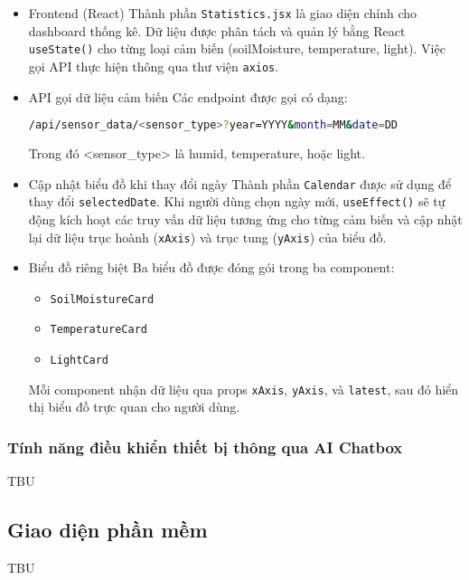 \begin{itemize}
    \item Frontend (React) \newline
    Thành phần \texttt{Statistics.jsx} là giao diện chính cho dashboard thống kê. Dữ liệu được phân tách và quản lý bằng React \texttt{useState()} cho từng loại cảm biến (soilMoisture, temperature, light). Việc gọi API thực hiện thông qua thư viện \texttt{axios}.

    \item API gọi dữ liệu cảm biến \newline
    Các endpoint được gọi có dạng:
    \begin{lstlisting}[language=bash]
/api/sensor_data/<sensor_type>?year=YYYY&month=MM&date=DD
    \end{lstlisting}
    Trong đó <sensor\_type> là humid, temperature, hoặc light.

    \item Cập nhật biểu đồ khi thay đổi ngày \newline
    Thành phần \texttt{Calendar} được sử dụng để thay đổi \texttt{selectedDate}. Khi người dùng chọn ngày mới, \texttt{useEffect()} sẽ tự động kích hoạt các truy vấn dữ liệu tương ứng cho từng cảm biến và cập nhật lại dữ liệu trục hoành (\texttt{xAxis}) và trục tung (\texttt{yAxis}) của biểu đồ.
    \item Biểu đồ riêng biệt
    Ba biểu đồ được đóng gói trong ba component:
    \begin{itemize}
        \item \texttt{SoilMoistureCard}
        \item \texttt{TemperatureCard}
        \item \texttt{LightCard}
    \end{itemize}
    Mỗi component nhận dữ liệu qua props \texttt{xAxis}, \texttt{yAxis}, và \texttt{latest}, sau đó hiển thị biểu đồ trực quan cho người dùng.
\end{itemize}
    
\subsubsection{Tính năng điều khiển thiết bị thông qua AI Chatbox}

TBU

\subsection{Giao diện phần mềm}

TBU

\newpage

